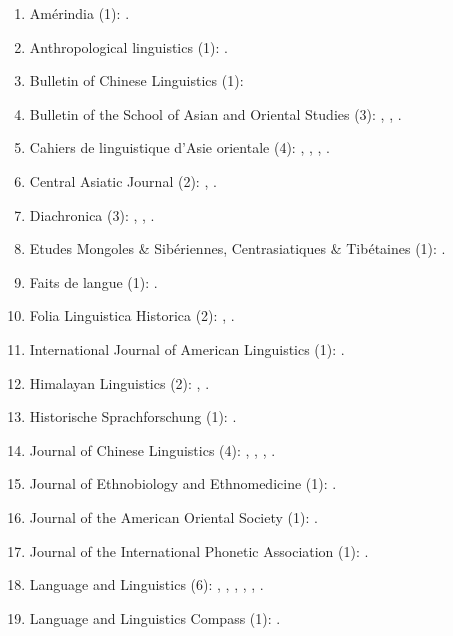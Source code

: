 \documentclass[oneside,a4paper,11pt]{article}
\begin{document}
 \begin{enumerate}
 \item Amérindia (1): \citet{jacques12bear}.
 \item Anthropological linguistics (1): \citet{japhug14ideophones}.
 \item Bulletin of Chinese Linguistics (1): \citet{jacques15derivational.khaling}
 \item Bulletin of the School of Asian and Oriental Studies (3):  \citet{jacques10refl}, \citet{rg-gj12yod}, \citet{jacques13yod}.
 \item Cahiers de linguistique d'Asie orientale (4): \citet{jacques00ywij},  \citet{jacques03dissimilation},   \citet{jacques07chang},  \citet{michaud10bonin}.
 \item Central Asiatic Journal (2):  \citet{jacques10imperial}, \citet{jacques14ergative}.
  \item Diachronica (3): \citet{jacques.michaud11naish}, \citet{michaud-jacques12nasalite}, \citet{jacques16comparative}.
  \item Etudes Mongoles \& Sibériennes, Centrasiatiques \& Tibétaines (1):  \citet{jacques09e}.
  \item Faits de langue (1): \citet{jacques07redupl}.
 \item Folia Linguistica Historica (2): \citet{jacques13arapaho}, \citet{jacques15causative}.
 \item International Journal of American Linguistics (1): \citet{jacques16ebde}.
 \item Himalayan Linguistics (2): \citet{jacques10zos},  \citet{jacques14rtau}.
 \item Historische Sprachforschung (1): \citet{jacques15cochon}.
 \item Journal of Chinese Linguistics (4):   \citet{jacques11tangut.verb}, \citet{jacques15sr}, \citet{jacques16relatives}, \citet{jacques17buyang}.
 \item Journal of Ethnobiology and Ethnomedicine (1): \citet{Kang2016}.
 \item Journal of the American Oriental Society (1): \citet{jacques11ngwemi}.
 \item Journal of the International Phonetic Association (1): \citet{jacques17ipa}.
   \item Language and Linguistics (6):  \citet{jacques07passif}, \citet{jacques09tangutverb}, \citet{jacques10inverse},     \citet{jacques11pumi.tone}, \citet{jacques12agreement},    \citet{jacques12khaling}.  
   \item  Language and Linguistics Compass (1): \citet{jacques14inverse}.   

\end{enumerate}
\end{document}
